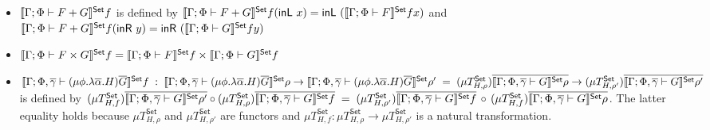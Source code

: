 \documentclass[runningheads]{llncs}
\newcommand{\set}{\mathsf{Set}}
\newcommand{\inl}{\mathsf{inL}\,}
\newcommand{\inr}{\mathsf{inR}\,}
\begin{document}
\begin{definition}
\begin{itemize}
\item %
  $\setsem{\Gamma;\Phi
  \vdash F + G}f$ is defined by $\setsem{\Gamma;\Phi \vdash
  F + G}f(\inl\,x) = \inl\,(\setsem{\Gamma;\Phi \vdash
  F}f x)$ and $\setsem{\Gamma;\Phi \vdash F +
  G}f(\inr\,y) = \inr\,(\setsem{\Gamma;\Phi \vdash G}f y)$
\item %
  $\setsem{\Gamma;\Phi \vdash F \times G}f = 
  \setsem{\Gamma;\Phi \vdash F}f \times \setsem{\Gamma;\Phi \vdash
    G}f$
\item %
$\setsem{\Gamma;\Phi,\ol\gamma \vdash (\mu  \phi.\lambda
    \ol{\alpha}. H)\ol{G}} f \;: \;\setsem{\Gamma;\Phi,\ol\gamma 
    \vdash (\mu \phi.\lambda \ol{\alpha}. H)\ol{G}} \rho \to
  \setsem{\Gamma;\Phi,\ol\gamma \vdash (\mu
    \phi.\lambda\ol{\alpha}. H)\ol{G}} \rho'
  \;= \;(\mu
  T^\set_{H,\rho})\ol{\setsem{\Gamma;\Phi,\ol\gamma \vdash G}\rho} \to (\mu
  T^\set_{H,\rho'})\ol{\setsem{\Gamma;\Phi,\ol\gamma \vdash G}\rho'}$
  is
  defined by
 $(\mu T^\set_{H,f})\ol{\setsem{\Gamma;\Phi,\ol\gamma \vdash
      G}\rho'} \circ (\mu T^\set_{H,\rho})\ol{\setsem{\Gamma;\Phi,\ol\gamma
      \vdash G}f}\; = \; (\mu T^\set_{H,\rho'})\ol{\setsem{\Gamma;\Phi,\ol\gamma
      \vdash G}f}\, \circ\, (\mu T^\set_{H,f})\ol{\setsem{\Gamma;\Phi,\ol\gamma
      \vdash G}\rho}$.
  The latter equality holds because $\mu
  T^\set_{H,\rho}$ and $\mu T^\set_{H,\rho'}$ are functors and $\mu
  T_{H,f}^\set : \mu T_{H,\rho}^\set \to \mu T_{H,\rho'}^\set$ is a
  natural transformation.

\end{itemize}
\end{definition}
\end{document}
